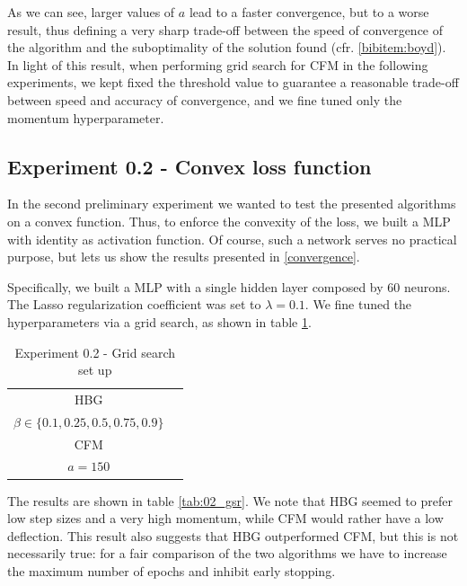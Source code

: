 As we can see, larger values of $a$ lead to a faster convergence, but to a worse result, thus defining a very sharp trade-off between the speed of convergence of the algorithm and the suboptimality of the solution found (cfr. \ref{bibitem:boyd}). In light of this result, when performing grid search for CFM in the following experiments, we kept fixed the threshold value to guarantee a reasonable trade-off between speed and accuracy of convergence, and we fine tuned only the momentum hyperparameter.

\subsection{Experiment 0.2 - Convex loss function}
\label{exp02}
In the second preliminary experiment we wanted to test the presented algorithms on a convex function. Thus, to enforce the convexity of the loss, we built a MLP with identity as activation function. Of course, such a network serves no practical purpose, but lets us show the results presented in \ref{convergence}.

Specifically, we built a MLP with a single hidden layer composed by 60 neurons. The Lasso regularization coefficient was set to $\lambda = 0.1$. We fine tuned the hyperparameters via a grid search, as shown in table \ref{tab:02_gs}.

\begin{table}[htbp]
    \centering
    \begin{tabular}{|c|c|}
        \hline
        HBG & \makecell{$\alpha \in 10^{-3} \times \{0.5, 0.75, 1, 2.5, 5, 7.75, 10, 25, 50\}$ \\ $\beta \in \{0.1, 0.25, 0.5, 0.75, 0.9\}$} \\
        \hline
        CFM & \makecell{$\gamma \in \{0.1, 0.15, 0.2, 0.3, 0.4, 0.5, 0.6, 0.75, 1, 1.25, 1.5\}$ \\ $a = 150$} \\ 
        \hline
    \end{tabular}
    \caption{Experiment 0.2 - Grid search set up}
    \label{tab:02_gs}
\end{table}

The results are shown in table \ref{tab:02_gsr}. We note that HBG seemed to prefer low step sizes and a very high momentum, while CFM would rather have a low deflection. This result also suggests that HBG outperformed CFM, but this is not necessarily true: for a fair comparison of the two algorithms we have to increase the maximum number of epochs and inhibit early stopping.

